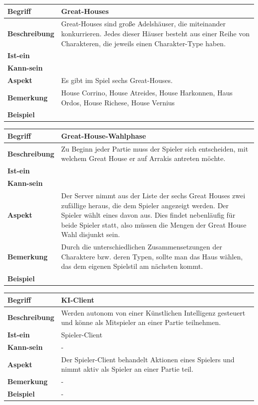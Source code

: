 \documentclass[12pt]{article}
\begin{document}
\begin{tabularx}{\linewidth}{|l|X|}
\hline
\textbf{Begriff} & \textbf{Great-Houses} \\
\hline
\textbf{Beschreibung} & Great-Houses sind große Adelshäuser, die miteinander konkurrieren. Jedes dieser Häuser besteht aus einer Reihe von Charakteren, die jeweils einen Charakter-Type haben. \\
\hline
\textbf{Ist-ein} & \\
\hline
\textbf{Kann-sein} & \\
\hline
\textbf{Aspekt} & Es gibt im Spiel sechs Great-Houses.\\
\hline
\textbf{Bemerkung} & House Corrino, House Atreides, House Harkonnen, Haus Ordos, House Richese, House Vernius \\
\hline
\textbf{Beispiel} &  \\
\hline
\end{tabularx}

\begin{tabularx}{\linewidth}{|l|X|}
\hline
\textbf{Begriff} & \textbf{Great-House-Wahlphase} \\
\hline
\textbf{Beschreibung} & Zu Beginn jeder Partie muss der Spieler sich entscheiden, mit welchem Great House er auf Arrakis antreten möchte. \\
\hline
\textbf{Ist-ein} & \\
\hline
\textbf{Kann-sein} & \\
\hline
\textbf{Aspekt} & Der Server nimmt aus der Liste der sechs Great Houses zwei zufällige heraus, die dem Spieler angezeigt werden. Der Spieler wählt eines davon aus. Dies findet nebenläufig für beide Spieler statt, also müssen die Mengen der Great House Wahl disjunkt sein.\\
\hline
\textbf{Bemerkung} & Durch die unterschiedlichen Zusammensetzungen der Charaktere bzw. deren Typen, sollte man das Haus wählen, das dem eigenen Spielstil am nächsten kommt. \\
\hline
\textbf{Beispiel} &  \\
\hline
\end{tabularx}

\begin{tabularx}{\linewidth}{|l|X|}
\hline
\textbf{Begriff} & \textbf{KI-Client} \\
\hline
\textbf{Beschreibung} & Werden autonom von einer Künstlichen Intelligenz gesteuert und könne als Mitspieler an einer Partie teilnehmen. \\
\hline
\textbf{Ist-ein} & Spieler-Client \\
\hline
\textbf{Kann-sein} & - \\
\hline
\textbf{Aspekt} & Der Spieler-Client behandelt Aktionen eines Spielers und nimmt aktiv als Spieler an einer Partie teil. \\
\hline
\textbf{Bemerkung} & - \\
\hline
\textbf{Beispiel} & - \\
\hline
\end{tabularx}
\end{document}
